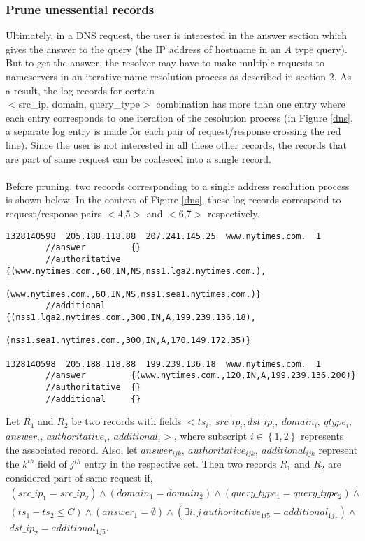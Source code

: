 \documentclass[11pt,a4paper]{article}
\begin{document}
\subsubsection{Prune unessential records}
Ultimately, in a DNS request, the user is interested in the answer section which gives the answer to the query (the IP address of hostname in an $A$ type query). But to get the answer, the resolver may have to make multiple requests to nameservers in an iterative name resolution process as described in section $2$. As a result, the log records for certain \\$<$src\_ip, domain, query\_type$>$ combination has more than one entry where each entry corresponds to one iteration of the resolution process (in Figure \ref{dns}, a separate log entry is made for each pair of request/response crossing the red line). Since the user is not interested in all these other records, the records that are part of same request can be coalesced into a single record.
\\\\
Before pruning, two records corresponding to a single address resolution process is shown below. In the context of Figure \ref{dns}, these log records correspond to request/response pairs $<$4,5$>$ and $<$6,7$>$ respectively. 
\begin{verbatim}
1328140598  205.188.118.88  207.241.145.25  www.nytimes.com.  1 
        //answer         {}    
        //authoritative  {(www.nytimes.com.,60,IN,NS,nss1.lga2.nytimes.com.),
                          (www.nytimes.com.,60,IN,NS,nss1.sea1.nytimes.com.)} 
        //additional     {(nss1.lga2.nytimes.com.,300,IN,A,199.239.136.18), 
                          (nss1.sea1.nytimes.com.,300,IN,A,170.149.172.35)}
                              
1328140598  205.188.118.88  199.239.136.18  www.nytimes.com.  1 
        //answer         {(www.nytimes.com.,120,IN,A,199.239.136.200)} 
        //authoritative  {}
        //additional     {}  
\end{verbatim}

\noindent
Let $R_{1}$ and $R_{2}$ be two records with fields
$<ts_{i},\ src\_ip_{i}, dst\_ip_{i},\ domain_{i},\ qtype_{i},\ $ $answer_{i},\ authoritative_{i},\ additional_{i}>$, where subscript $i \in \left \{ 1,2 \right \}$ represents the associated record. Also, let $answer_{ijk},\ authoritative_{ijk},\ additional_{ijk}$ represent the $k^{th}$ field of $j^{th}$ entry in the respective set. Then two records $R_{1}$ and $R_{2}$ are considered part of same request if,
\begin{equation}
\begin{split}
(src\_ip_{1} = src\_ip_{2})\wedge
(domain_{1} = domain_{2})\wedge
(query\_type_{1} = query\_type_{2})\wedge \\
(ts_{1}-ts_{2}\le C)\wedge
(answer_{1} = \emptyset)\wedge
(\exists i,j\ authoritative_{1i5} = additional_{1j1})\wedge \\
dst\_ip_{2} = additional_{1j5}.
\end{split}
\end{equation}
\end{document}
